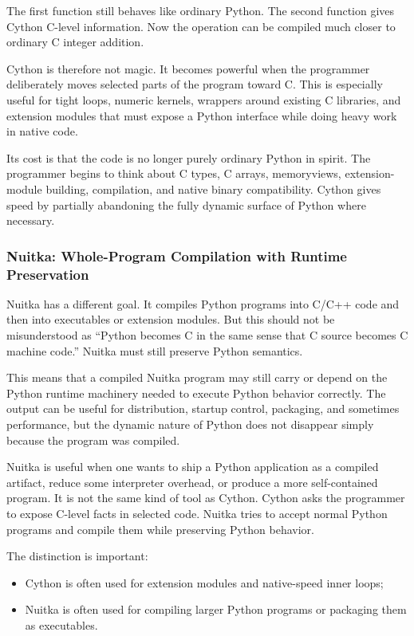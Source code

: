 The first function still behaves like ordinary Python. The second function gives Cython C-level information. Now the operation can be compiled much closer to ordinary C integer addition.

Cython is therefore not magic. It becomes powerful when the programmer deliberately moves selected parts of the program toward C. This is especially useful for tight loops, numeric kernels, wrappers around existing C libraries, and extension modules that must expose a Python interface while doing heavy work in native code.

Its cost is that the code is no longer purely ordinary Python in spirit. The programmer begins to think about C types, C arrays, memoryviews, extension-module building, compilation, and native binary compatibility. Cython gives speed by partially abandoning the fully dynamic surface of Python where necessary.

\subsubsection{Nuitka: Whole-Program Compilation with Runtime Preservation}

Nuitka has a different goal. It compiles Python programs into C/C++ code and then into executables or extension modules. But this should not be misunderstood as “Python becomes C in the same sense that C source becomes C machine code.” Nuitka must still preserve Python semantics.

This means that a compiled Nuitka program may still carry or depend on the Python runtime machinery needed to execute Python behavior correctly. The output can be useful for distribution, startup control, packaging, and sometimes performance, but the dynamic nature of Python does not disappear simply because the program was compiled.

Nuitka is useful when one wants to ship a Python application as a compiled artifact, reduce some interpreter overhead, or produce a more self-contained program. It is not the same kind of tool as Cython. Cython asks the programmer to expose C-level facts in selected code. Nuitka tries to accept normal Python programs and compile them while preserving Python behavior.

The distinction is important:

\begin{itemize}
    \item Cython is often used for extension modules and native-speed inner loops;
    \item Nuitka is often used for compiling larger Python programs or packaging them as executables.
\end{itemize}

